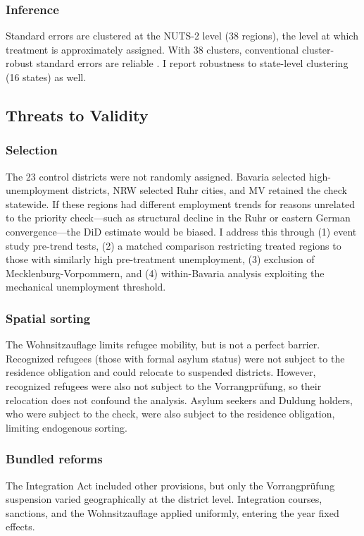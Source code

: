 \documentclass[12pt]{article}
\begin{document}
\subsubsection*{Inference} Standard errors are clustered at the NUTS-2 level (38 regions), the level at which treatment is approximately assigned. With 38 clusters, conventional cluster-robust standard errors are reliable \citep{callawaysantanna2021}. I report robustness to state-level clustering (16 states) as well.

\subsection{Threats to Validity}

\subsubsection*{Selection} The 23 control districts were not randomly assigned. Bavaria selected high-unemployment districts, NRW selected Ruhr cities, and MV retained the check statewide. If these regions had different employment trends for reasons unrelated to the priority check---such as structural decline in the Ruhr or eastern German convergence---the DiD estimate would be biased. I address this through (1) event study pre-trend tests, (2) a matched comparison restricting treated regions to those with similarly high pre-treatment unemployment, (3) exclusion of Mecklenburg-Vorpommern, and (4) within-Bavaria analysis exploiting the mechanical unemployment threshold.

\subsubsection*{Spatial sorting} The Wohnsitzauflage limits refugee mobility, but is not a perfect barrier. Recognized refugees (those with formal asylum status) were not subject to the residence obligation and could relocate to suspended districts. However, recognized refugees were also not subject to the Vorrangpr\"ufung, so their relocation does not confound the analysis. Asylum seekers and Duldung holders, who were subject to the check, were also subject to the residence obligation, limiting endogenous sorting.

\subsubsection*{Bundled reforms} The Integration Act included other provisions, but only the Vorrangpr\"ufung suspension varied geographically at the district level. Integration courses, sanctions, and the Wohnsitzauflage applied uniformly, entering the year fixed effects.
\end{document}
